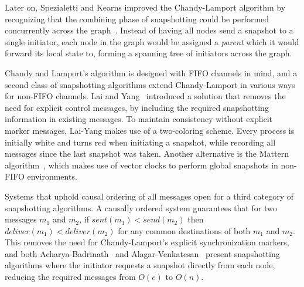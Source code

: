 Later on, Spezialetti and Kearns improved the Chandy-Lamport algorithm by
recognizing that the combining phase of snapshotting could be performed
concurrently across the graph~\cite{spez-k}. Instead of having all nodes send a
snapshot to a single initiator, each node in the graph would be assigned a
\textit{parent} which it would forward its local state to, forming a spanning
tree of initiators across the graph.

Chandy and Lamport's algorithm is designed with FIFO channels in mind, and a
second class of snapshotting algorithms extend Chandy-Lamport in various ways
for non-FIFO channels. Lai and Yang~\cite{lai-yang} introduced a solution that
removes the need for explicit control messages, by including the required
snapshotting information in existing messages. To maintain consistency without
explicit marker messages, Lai-Yang makes use of a two-coloring scheme. Every
process is initially white and turns red when initiating a snapshot, while
recording all messages since the last snapshot was taken. Another alternative is
the Mattern algorithm~\cite{mattern}, which makes use of vector clocks to
perform global snapshots in non-FIFO environments.

Systems that uphold causal ordering of all messages open for a third category of
snapshotting algorithms. A causally ordered system guarantees that for two
messages $ m_1 $ and $ m_2 $, if $ sent(m_1) < send(m_2) $ then $ deliver(m_1) <
deliver(m_2) $ for any common destinations of both $ m_1 $ and $ m_2 $. This
removes the need for Chandy-Lamport's explicit synchronization markers, and both
Acharya-Badrinath~\cite{acharya} and Alagar-Venkatesan~\cite{alagar} present
snapshotting algorithms where the initiator requests a snapshot directly from
each node, reducing the required messages from $ O(e) $ to $ O(n) $.
